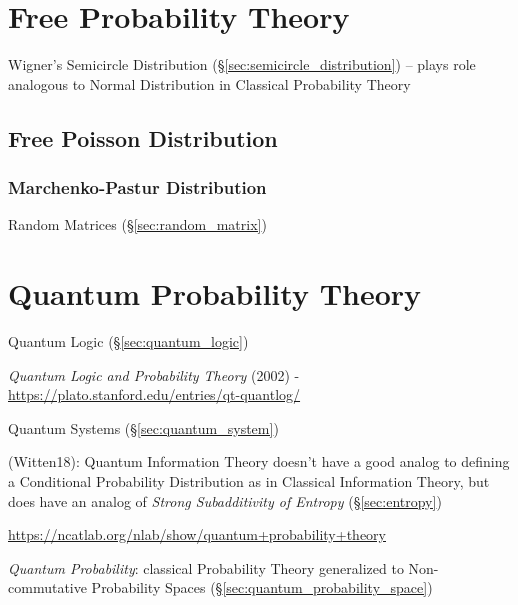 \section{Free Probability Theory}\label{sec:free_probability}

Wigner's Semicircle Distribution (\S\ref{sec:semicircle_distribution}) -- plays
role analogous to Normal Distribution in Classical Probability Theory



\subsection{Free Poisson Distribution}\label{sec:free_poisson}

\subsubsection{Marchenko-Pastur Distribution}\label{sec:marchenko_pastur}

Random Matrices (\S\ref{sec:random_matrix})



\section{Quantum Probability Theory}\label{sec:quantum_probability}

Quantum Logic (\S\ref{sec:quantum_logic})

\emph{Quantum Logic and Probability Theory} (2002) -
\url{https://plato.stanford.edu/entries/qt-quantlog/}

Quantum Systems (\S\ref{sec:quantum_system})

(Witten18): Quantum Information Theory doesn't have a good analog to defining a
Conditional Probability Distribution as in Classical Information Theory, but
does have an analog of \emph{Strong Subadditivity of Entropy}
(\S\ref{sec:entropy})

\url{https://ncatlab.org/nlab/show/quantum+probability+theory}

\emph{Quantum Probability}: classical Probability Theory generalized to
Non-commutative Probability Spaces (\S\ref{sec:quantum_probability_space})

